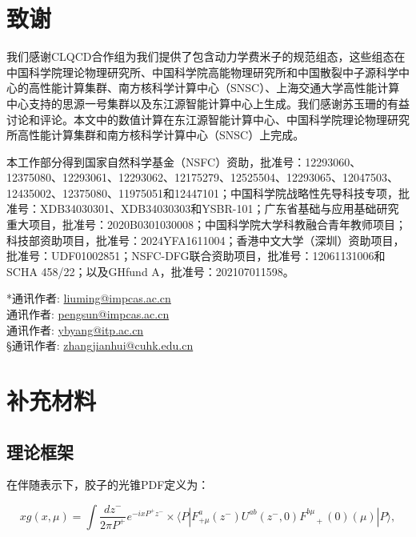 \documentclass[12pt,a4paper]{ctexart}
\begin{document}
\section*{致谢}

我们感谢CLQCD合作组为我们提供了包含动力学费米子的规范组态\cite{CLQCD-2024,CLQCD-2025}，这些组态在中国科学院理论物理研究所、中国科学院高能物理研究所和中国散裂中子源科学中心的高性能计算集群、南方核科学计算中心（SNSC）、上海交通大学高性能计算中心支持的思源一号集群以及东江源智能计算中心上生成。我们感谢苏玉珊的有益讨论和评论。本文中的数值计算在东江源智能计算中心、中国科学院理论物理研究所高性能计算集群和南方核科学计算中心（SNSC）上完成。

本工作部分得到国家自然科学基金（NSFC）资助，批准号：12293060、12375080、12293061、12293062、12175279、12525504、12293065、12047503、12435002、12375080、11975051和12447101；中国科学院战略性先导科技专项，批准号：XDB34030301、XDB34030303和YSBR-101；广东省基础与应用基础研究重大项目，批准号：2020B0301030008；中国科学院大学科教融合青年教师项目；科技部资助项目，批准号：2024YFA1611004；香港中文大学（深圳）资助项目，批准号：UDF01002851；NSFC-DFG联合资助项目，批准号：12061131006和SCHA 458/22；以及GHfund A，批准号：202107011598。

\vspace{10pt}
\begin{flushleft}
*通讯作者: \url{liuming@impcas.ac.cn}\\
\dag 通讯作者: \url{pengsun@impcas.ac.cn}\\
\ddag 通讯作者: \url{ybyang@itp.ac.cn}\\
\S 通讯作者: \url{zhangjianhui@cuhk.edu.cn}
\end{flushleft}


\newpage
\section*{补充材料}

\subsection*{理论框架}

在伴随表示下，胶子的光锥PDF定义为：

\begin{equation}
xg(x, \mu) = \int \frac{dz^-}{2\pi P^+} e^{-ixP^+z^-} \times \langle P|F^a_{+\mu}(z^-)U^{ab}(z^-,0)F^{b\mu}_{\phantom{b\mu}+}(0)(\mu)|P\rangle,
\label{eq:lightcone_pdf}
\end{equation}
\end{document}
